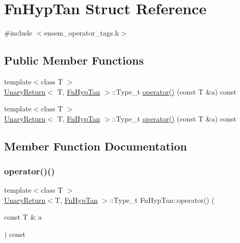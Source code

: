 \hypertarget{structFnHypTan}{}\section{Fn\+Hyp\+Tan Struct Reference}
\label{structFnHypTan}


{\ttfamily \#include $<$ensem\+\_\+operator\+\_\+tags.\+h$>$}

\subsection*{Public Member Functions}
\begin{DoxyCompactItemize}
\item 
{\footnotesize template$<$class T $>$ }\\\mbox{\hyperlink{structUnaryReturn}{Unary\+Return}}$<$ T, \mbox{\hyperlink{structFnHypTan}{Fn\+Hyp\+Tan}} $>$\+::Type\+\_\+t \mbox{\hyperlink{structFnHypTan_a549867ce795e58e29cc5c574347de91b}{operator()}} (const T \&a) const
\item 
{\footnotesize template$<$class T $>$ }\\\mbox{\hyperlink{structUnaryReturn}{Unary\+Return}}$<$ T, \mbox{\hyperlink{structFnHypTan}{Fn\+Hyp\+Tan}} $>$\+::Type\+\_\+t \mbox{\hyperlink{structFnHypTan_a549867ce795e58e29cc5c574347de91b}{operator()}} (const T \&a) const
\end{DoxyCompactItemize}


\subsection{Member Function Documentation}
\mbox{\label{structFnHypTan_a549867ce795e58e29cc5c574347de91b}} 
\subsubsection{\texorpdfstring{operator()()}{operator()()}\hspace{0.1cm}{\footnotesize\ttfamily [1/2]}}
{\footnotesize\ttfamily template$<$class T $>$ \\
\mbox{\hyperlink{structUnaryReturn}{Unary\+Return}}$<$T, \mbox{\hyperlink{structFnHypTan}{Fn\+Hyp\+Tan}} $>$\+::Type\+\_\+t Fn\+Hyp\+Tan\+::operator() (\begin{DoxyParamCaption}\item[{const T \&}]{a }\end{DoxyParamCaption}) const\hspace{0.3cm}{\ttfamily [inline]}}

